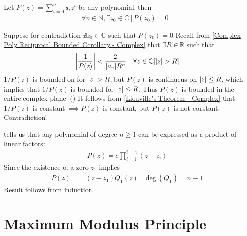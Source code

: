 \documentclass[12pt, english]{book}
\makeatletter
\renewenvironment{proof}[1][\proofname]{\par
	\pushQED{\qed}%
	\normalfont \topsep6\p@\@plus6\p@\relax
	\list{}{%
		\settowidth{\leftmargin}{\itshape\proofname:\hskip\labelsep}%
		\setlength{\labelwidth}{0pt}%
		\setlength{\itemindent}{-\leftmargin}%
	}%
	\item[\hskip\labelsep\itshape#1\@addpunct{:}]\ignorespaces
	}{ \popQED\endlist\@endpefalse}
\makeatother
\begin{document}
	\begin{theorem}
		\label{Fundamental Theorem of Algebra - Complex}
		Let \(P(z) = \sum_{i=0}^{n} a_i z^i\) be any polynomial, then
		\begin{align*}
			\forall n \in \mathbb{N}, \exists z_0 \in \mathbb{C}[P(z_0) = 0]
		\end{align*}
	\end{theorem}
	\begin{proof}
		Suppose for contradiction \(\nexists z_0 \in \mathbb{C}\) such that \(P(z_0) = 0\)
		Recall from \cref{Complex Poly Reciprocal Bounded Corollary - Complex} that \(\exists R \in \mathbb{R}\) such that 
		\begin{align*}
			\abs{\frac{1}{P(z)}} &< \frac{2}{\abs{a_n} R^n} & \forall z \in \mathbb{C} [\abs{z} > R]
		\end{align*}
		\(1/P(z)\) is bounded on for \(\abs{z}>R\), but \(P(z)\) is continuous on \(\abs{z}\leq R\), which implies that \(1/P(z)\) is bounded for \(\abs{z}\leq R\). Thus \(P(z)\) is bounded in the entire complex plane. ()
		It follows from \cref{Liouville's Theorem - Complex} that \(1/P(z)\) is constant \(\implies P(z)\) is constant, but \(P(z)\) is not constant. Contradiction!
	\end{proof}

	 tells us that any polynomial of degree \(n\geq 1\) can be expressed as a product of linear factors:
	\begin{align*}
		P(z) = c \prod_{i = 1}^{i=n} (z-z_i)
	\end{align*}
	Since the existence of a zero \(z_1\) implies 
	\begin{align*}
		P(z) &= (z-z_1)Q_1(z) & \deg (Q_1) = n-1
	\end{align*}
	Result follows from induction.
	
	\section{Maximum Modulus Principle} \label{Maximum Modulus Principle Section - Complex}
	
\end{document}
